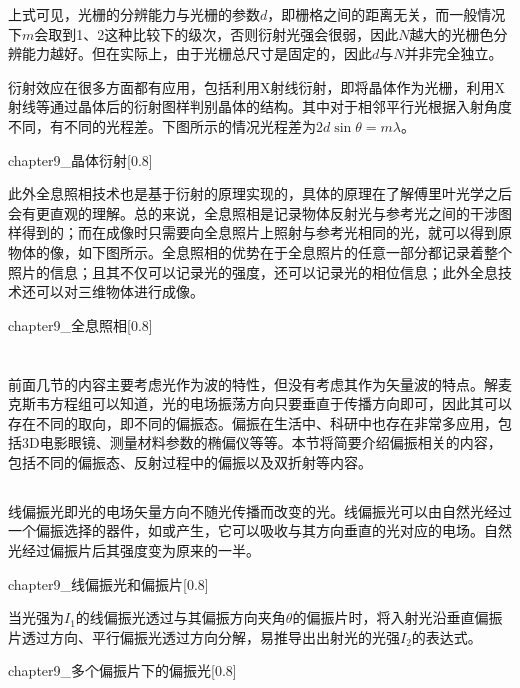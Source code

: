 上式可见，光栅的分辨能力与光栅的参数$d$，即栅格之间的距离无关，而一般情况下$m$会取到1、2这种比较下的级次，否则衍射光强会很弱，因此$N$越大的光栅色分辨能力越好。但在实际上，由于光栅总尺寸是固定的，因此$d$与$N$并非完全独立。

衍射效应在很多方面都有应用，包括利用X射线衍射，即将晶体作为光栅，利用X射线等通过晶体后的衍射图样判别晶体的结构。其中对于相邻平行光根据入射角度不同，有不同的光程差。下图所示的情况光程差为$2d\sin\theta = m\lambda$。
\begin{singlefigure}[晶体衍射示意图]{chapter9_晶体衍射}[0.8]
\end{singlefigure}

此外全息照相技术也是基于衍射的原理实现的，具体的原理在了解傅里叶光学之后会有更直观的理解。总的来说，全息照相是记录物体反射光与参考光之间的干涉图样得到的；而在成像时只需要向全息照片上照射与参考光相同的光，就可以得到原物体的像，如下图所示。全息照相的优势在于全息照片的任意一部分都记录着整个照片的信息；且其不仅可以记录光的强度，还可以记录光的相位信息；此外全息技术还可以对三维物体进行成像。
\begin{singlefigure}[全息照相示意图]{chapter9_全息照相}[0.8]
\end{singlefigure}

\section[偏振]{}
前面几节的内容主要考虑光作为波的特性，但没有考虑其作为矢量波的特点。解麦克斯韦方程组可以知道，光的电场振荡方向只要垂直于传播方向即可，因此其可以存在不同的取向，即不同的偏振态。偏振在生活中、科研中也存在非常多应用，包括3D电影眼镜、测量材料参数的椭偏仪等等。本节将简要介绍偏振相关的内容，包括不同的偏振态、反射过程中的偏振以及双折射等内容。
\subsection[线偏振]{}
线偏振光即光的电场矢量方向不随光传播而改变的光。线偏振光可以由自然光经过一个偏振选择的器件，如或产生，它可以吸收与其方向垂直的光对应的电场。自然光经过偏振片后其强度变为原来的一半。
\begin{singlefigure}[线偏振光和偏振片]{chapter9_线偏振光和偏振片}[0.8]
\end{singlefigure}

当光强为$I_1$的线偏振光透过与其偏振方向夹角$\theta$的偏振片时，将入射光沿垂直偏振片透过方向、平行偏振光透过方向分解，易推导出出射光的光强$I_2$的表达式。
\begin{singlefigure}[经过多个偏振片下的偏振光]{chapter9_多个偏振片下的偏振光}[0.8]
\end{singlefigure}

